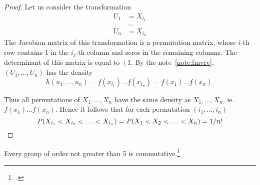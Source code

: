 \begin{proof}
Let us consider the transformation
\begin{align*}
U_1 &= X_{i_1} \\
& \ldots \\
U_n &= X_{i_n}
\end{align*}
The Jacobian matrix of this transformation is a permutation matrix,
whose $i$-th row contains 1 in the $i_j$-th column and zeros in the
remaining columns. The determinant of this matrix is equal to $\pm 1$.
By the note~\ref{note:fmvrv}, $(U_1, \ldots, U_n)$ has the density
\[
h(u_1, \ldots, u_n) = f(x_{i_1}) \ldots f(x_{i_n}) = f(x_1) \ldots f(x_n).
\]

Thus all permutations of $X_1, \ldots, X_n$ have the same density as
$X_1, \ldots, X_n$, ie. $f(x_1)\ldots f(x_n)$. Hence it follows that
for each permutation $(i_1, \ldots, i_n)$
\[
\Pr(X_{i_1} < X_{i_2} < \ldots < X_{i_n}) = \Pr(X_1 < X_2 < \ldots <
X_n) = 1 / n! \qedhere
\]
\end{proof}

\begin{note}
  Every group of order not greater than 5 is
  commutative.\footnote{\cite [p.~58] {lang-1984}.}
\end{note}

